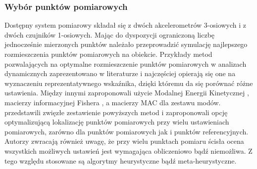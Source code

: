 \subsubsection{Wybór punktów pomiarowych} \label{sect:choose_measuremanet_locations}
Dostępny system pomiarowy składał się z dwóch akcelerometrów 3-osiowych i z dwóch czujników 1-osiowych.  Mając do dyspozycji ograniczoną liczbę jednocześnie mierzonych punktów należało przeprowadzić symulację najlepszego rozmieszczenia punktów pomiarowych na obiekcie. Przykłady metod pozwalających na optymalne rozmieszczenie punktów pomiarowych w analizach dynamicznych zaprezentowano w literaturze i najczęściej opierają się one na wyznaczeniu reprezentatywnego wskaźnika, dzięki któremu da się porównać różne ustawienia. Między innymi \cite{Kammer1991,Papadopoulos1998} zaproponowali użycie Modalnej Energii Kinetycznej , \cite{Udwadia1994} macierzy informacyjnej Fishera , a \cite{Penny1994,Allemang2003} macierzy MAC dla zestawu modów. \cite{Zhang2017} przedstawili zwięzłe zestawienie powyższych metod i zaproponowali opcję optymalizującą lokalizację punktów pomiarowych przy wielu ustawieniach pomiarowych, zarówno dla punktów pomiarowych jak i punktów referencyjnych. Autorzy zwracają również uwagę, że przy wielu punktach pomiaru ścisła ocena wszystkich możliwych ustawień jest wymagająca obliczeniowo bądź niemożliwa. Z tego względu stosowane są algorytmy heurystyczne bądź meta-heurystyczne. 

